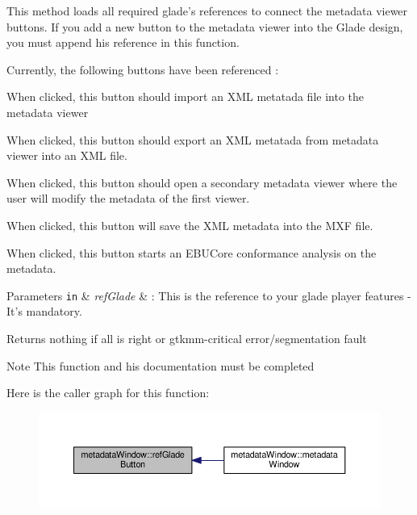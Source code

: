 This method loads all required glade's references to connect the metadata viewer buttons. If you add a new button to the metadata viewer into the Glade design, you must append his reference in this function.\par
 \par
 Currently, the following buttons have been referenced \-:\par
 \begin{DoxyItemize}
\item { When} clicked, this button should import an X\-M\-L metatada file into the metadata viewer \item { When} clicked, this button should export an X\-M\-L metatada from metadata viewer into an X\-M\-L file. \item { When} clicked, this button should open a secondary metadata viewer where the user will modify the metadata of the first viewer. \item { When} clicked, this button will save the X\-M\-L metadata into the M\-X\-F file. \item { When} clicked, this button starts an E\-B\-U\-Core conformance analysis on the metadata. \par
 \par
 
\begin{DoxyParams}[1]{Parameters}
\mbox{\tt in}  & {\em ref\-Glade} & \-: This is the reference to your glade player features -\/ It's mandatory. \\
\hline
\end{DoxyParams}
\begin{DoxyReturn}{Returns}
nothing if all is right or gtkmm-\/critical error/segmentation fault 
\end{DoxyReturn}
\begin{DoxyNote}{Note}
This function and his documentation must be completed 
\end{DoxyNote}
\end{DoxyItemize}


Here is the caller graph for this function\-:\nopagebreak
\begin{figure}[H]
\begin{center}
\leavevmode
\includegraphics[width=350pt]{classmetadataWindow_a10eadf8977d80290cf4645c3c952526f_icgraph}
\end{center}
\end{figure}


